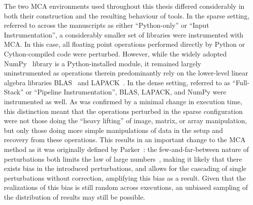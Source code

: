 The two MCA environments used throughout this thesis differed considerably in both their construction and the
resulting behaviour of tools. In the sparse setting, referred to across the manuscripts as either ``Python-only''
or ``Input Instrumentation'', a considerably smaller set of libraries were instrumented with MCA. In this case,
all floating point operations performed directly by Python or Cython-compiled code were perturbed. However, while
the widely adopted NumPy~\cite{harris2020array} library is a Python-installed module, it remained largely
uninstrumented as operations therein predominantly rely on the lower-level linear algebra libraries
BLAS~\cite{lawson1979basic} and LAPACK~\cite{anderson1999lapack}. In the dense setting, referred to as ``Full-Stack''
or ``Pipeline Instrumentation'', BLAS, LAPACK, and NumPy were instrumented as well. As was confirmed by a minimal
change in execution time, this distinction meant that the operations perturbed in the sparse configuration were not
those doing the ``heavy lifting'' of image, matrix, or array manipulation, but only those doing more simple
manipulations of data in the setup and recovery from these operations. This results in an important change to the
MCA method as it was originally defined by Parker~\cite{Parker1997-qq}: the few-and-far-between nature of
perturbations both limits the law of large numbers~\cite{hsu1947complete}, making it likely that there exists bias
in the introduced perturbations, and allows for the cascading of single perturbations without correction, amplifying
this bias as a result. Given that the realizations of this bias is still random across executions, an unbiased
sampling of the distribution of results may still be possible.

